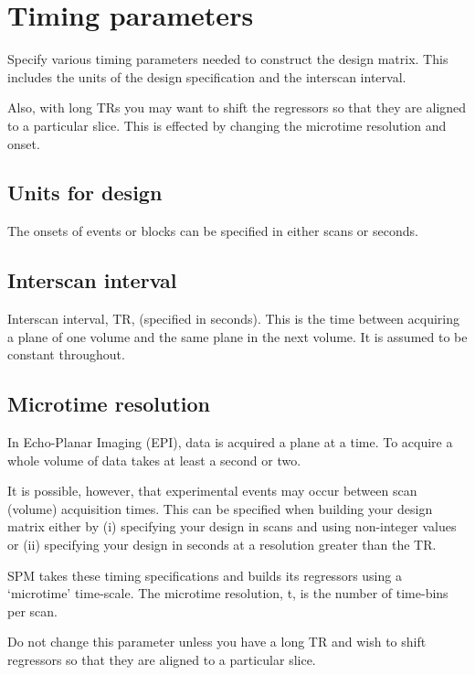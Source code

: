 \documentclass[a4paper,titlepage]{book}
\begin{document}
\section{Timing parameters}
Specify various timing parameters needed to construct the design matrix. This includes the units of the design specification and the interscan interval.

                                                                                                            

Also, with long TRs you may want to shift the regressors so that they are aligned to a particular slice.  This is effected by changing the microtime resolution and onset. 


\subsection{Units for design}
The onsets of events or blocks can be specified in either scans or seconds.


\subsection{Interscan interval}
Interscan interval, TR, (specified in seconds).  This is the time between acquiring a plane of one volume and the same plane in the next volume.  It is assumed to be constant throughout.


\subsection{Microtime resolution}

In Echo-Planar Imaging (EPI), data is acquired a plane
at a time. To acquire a whole volume of data takes at least a second or two.

It is possible, however, that 
experimental events may occur
between scan (volume) acquisition times. This can be specified when building your design matrix either by (i) specifying your design in scans and using non-integer values  or (ii) specifying your design in seconds at a 
resolution greater than the TR.

SPM takes these timing specifications and builds its 
regressors using a `microtime' time-scale. The microtime resolution, t, is the number of time-bins per scan. 

Do not change this parameter unless you have a long TR and wish to shift regressors so that they are aligned to a particular slice. 
\end{document}
